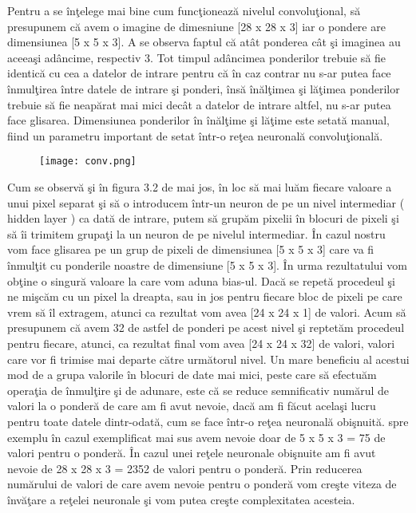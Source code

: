\par

Pentru a se \^{i}n\c{t}elege mai bine cum func\c{t}ioneaz\u{a} nivelul convolu\c{t}ional, s\u{a} presupunem c\u{a} avem o imagine de dimesniune [28 x 28 x 3] iar o pondere are dimensiunea [5 x 5 x 3]. A se observa faptul c\u{a} at\^{a}t  ponderea c\^{a}t \c{s}i imaginea au aceea\c{s}i ad\^{a}ncime, respectiv 3. Tot timpul ad\^{a}ncimea ponderilor trebuie s\u{a} fie identic\u{a} cu cea a datelor de intrare pentru c\u{a} \^{i}n caz contrar nu s-ar putea face \^{i}nmul\c{t}irea \^{i}ntre datele de intrare \c{s}i ponderi, \^{i}ns\u{a} \^{i}n\u{a}l\c{t}imea \c{s}i l\u{a}\c{t}imea ponderilor trebuie s\u{a} fie neap\u{a}rat mai mici dec\^{a}t a datelor de intrare altfel, nu s-ar putea face glisarea. Dimensiunea ponderilor \^{i}n \^{i}n\u{a}l\c{t}ime \c{s}i l\u{a}\c{t}ime este setat\u{a} manual, fiind un parametru important de setat \^{i}ntr-o re\c{t}ea neuronal\u{a} convolu\c{t}ional\u{a}. 

\begin{figure}[h!]
  \centering
  \texttt{[image: conv.png]}
\end{figure}

Cum se observ\u{a} \c{s}i \^{i}n figura 3.2 de mai jos, \^{i}n loc s\u{a} mai lu\u{a}m fiecare valoare a unui pixel separat \c{s}i s\u{a} o introducem \^{i}ntr-un neuron de pe un nivel intermediar ( hidden layer ) ca dat\u{a} de intrare, putem s\u{a} grup\u{a}m pixelii \^{i}n blocuri de pixeli \c{s}i s\u{a} \^{i}i trimitem grupa\c{t}i la un neuron de pe nivelul intermediar. \^{I}n cazul nostru vom face glisarea pe un grup de pixeli de dimensiunea [5 x 5 x 3] care va fi \^{i}nmul\c{t}it cu ponderile noastre de dimensiune [5 x 5 x 3]. \^{I}n urma rezultatului vom ob\c{t}ine o singur\u{a} valoare la care vom aduna bias-ul. Dac\u{a} se repet\u{a} procedeul  \c{s}i ne mi\c{s}c\u{a}m cu un pixel la dreapta, sau in jos pentru fiecare bloc de pixeli pe care vrem s\u{a} \^{i}l extragem, atunci ca rezultat vom avea [24 x 24 x 1] de valori. Acum s\u{a} presupunem c\u{a} avem 32 de astfel de ponderi pe acest nivel \c{s}i reptet\u{a}m procedeul pentru fiecare, atunci, ca rezultat final vom avea [24 x 24 x 32] de valori, valori care vor fi trimise mai departe c\u{a}tre urm\u{a}torul nivel. Un mare beneficiu al acestui mod de a grupa valorile \^{i}n blocuri de date mai mici, peste care s\u{a} efectu\u{a}m opera\c{t}ia de \^{i}nmul\c{t}ire \c{s}i de adunare, este c\u{a} se reduce semnificativ num\u{a}rul de valori la o  ponder\u{a} de care am fi avut nevoie, dac\u{a} am fi f\u{a}cut acela\c{s}i lucru pentru toate datele dintr-odat\u{a}, cum se face \^{i}ntr-o re\c{t}ea neuronal\u{a} obi\c{s}nuit\u{a}. spre exemplu \^{i}n cazul exemplificat mai sus avem nevoie doar de 5 x 5 x 3 = 75 de valori pentru o ponder\u{a}. \^{I}n cazul unei re\c{t}ele neuronale obi\c{s}nuite am fi avut nevoie de 28 x 28 x 3 = 2352 de valori pentru o ponder\u{a}. Prin reducerea num\u{a}rului de valori de care avem nevoie pentru o ponder\u{a} vom cre\c{s}te viteza de \^{i}nv\u{a}\c{t}are a re\c{t}elei neuronale \c{s}i vom putea cre\c{s}te complexitatea acesteia.

